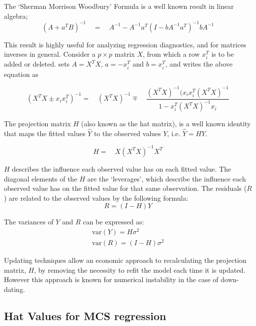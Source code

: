 \documentclass[12pt, a4paper]{article}
\begin{document}
The `Sherman Morrison Woodbury' Formula is a well known result in
linear algebra;
\begin{equation}
(A+a^{T}B)^{-1} \quad = \quad A^{-1}-
A^{-1}a^{T}(I-bA^{-1}a^{T})^{-1}bA^{-1}
\end{equation}

This result is highly useful for analyzing regression diagnostics,
and for matrices inverses in general. Consider a $p \times p$
matrix $X$, from which a row $x_{i}^{T}$ is to be added or
deleted. \citet{CookWeisberg} sets $A = X^{T}X$, $a=-x_{i}^{T}$
and $b=x_{i}^{T}$, and writes the above equation as

\begin{equation}
(X^{T}X \pm x_{i}x_{i}^{T})^{-1} = \quad(X^{T}X )^{-1} \mp \quad
\frac{(X^{T}X)^{-1}(x_{i}x_{i}^{T}(X^{T}X)^{-1}}{1-x_{i}^{T}(X^{T}X)^{-1}x_{i}}
\end{equation}

The projection matrix $H$ (also known as the hat matrix), is a
well known identity that maps the fitted values $\hat{Y}$ to the
observed values $Y$, i.e. $\hat{Y} = HY$.

\begin{equation}
H =\quad X(X^{T}X)^{-1}X^{T}
\end{equation}

$H$ describes the influence each observed value has on each fitted value. The diagonal elements of the $H$ are the `leverages', which describe the influence each observed value has on the fitted value for that same observation. The residuals ($R$) are related to the observed values by the following formula:
\begin{equation}
R = (I-H)Y
\end{equation}

The variances of $Y$ and $R$ can be expressed as:
\begin{eqnarray}
\mbox{var}(Y) = H\sigma^{2} \nonumber\\
\mbox{var}(R) = (I-H)\sigma^{2}
\end{eqnarray}

Updating techniques allow an economic approach to recalculating the projection matrix, $H$, by removing the necessity to refit the model each time it is updated. However this approach is known for
numerical instability in the case of down-dating.



\subsection{Hat Values for MCS regression}
\end{document}
